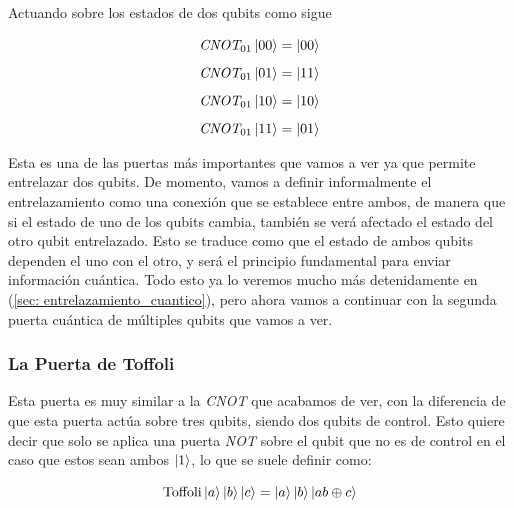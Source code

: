 \documentclass[12pt]{article}
\numberwithin{equation}{section} %
\begin{document}
    \vspace{2.5mm}

    Actuando sobre los estados de dos qubits como sigue

    \begin{align*}
        \textit{CNOT}_{01} \ket{0 0} &= \ket{0 0} \\[5pt]
        \textit{CNOT}_{01} \ket{0 1} &= \ket{1 1} \\[5pt]
        \textit{CNOT}_{01} \ket{1 0} &= \ket{1 0} \\[5pt]
        \textit{CNOT}_{01} \ket{1 1} &= \ket{0 1}
    \end{align*}

    \vspace{2.5mm}

    Esta es una de las puertas más importantes que vamos a ver ya que permite entrelazar dos qubits. De momento, vamos a definir informalmente el entrelazamiento como una conexión que se establece entre ambos, de manera que si el estado de uno de los qubits cambia, también se verá afectado el estado del otro qubit entrelazado. Esto se traduce como que el estado de ambos qubits dependen el uno con el otro, y será el principio fundamental para enviar información cuántica. Todo esto ya lo veremos mucho más detenidamente en (\ref{sec: entrelazamiento_cuantico}), pero ahora vamos a continuar con la segunda puerta cuántica de múltiples qubits que vamos a ver.

    \vspace{5mm}





    \subsubsection{La Puerta de Toffoli}\label{subsubsection: la_puerta_de_toffoli}

    \vspace{5mm}

    Esta puerta es muy similar a la \textit{CNOT} que acabamos de ver, con la diferencia de que esta puerta actúa sobre tres qubits, siendo dos qubits de control. Esto quiere decir que solo se aplica una puerta \textit{NOT} sobre el qubit que no es de control en el caso que estos sean ambos \( \ket{1} \), lo que se suele definir como:

    \begin{equation*}
        \text{Toffoli} \ket{a} \ket{b} \ket{c} = \ket{a} \ket{b} \ket{a b \oplus c}
    \end{equation*}
\end{document}
